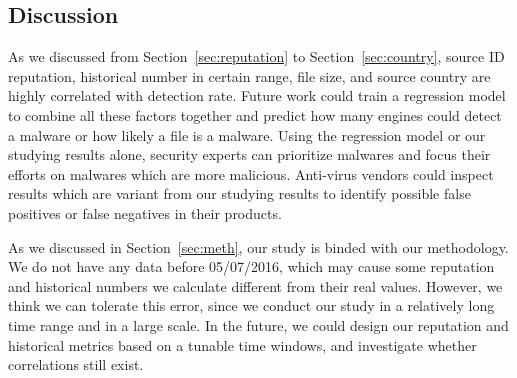 \subsection{Discussion}

As we discussed from Section~\ref{sec:reputation} to Section~\ref{sec:country}, 
source ID reputation, historical number in certain range, file size, 
and source country are highly correlated with detection rate. 
Future work could train a regression model to combine all these factors together and 
predict how many engines could detect a malware or how likely a file is a malware. 
Using the regression model or our studying results alone, 
security experts can prioritize malwares and focus their efforts on malwares which are more malicious. 
Anti-virus vendors could inspect results which are variant from our studying results 
to identify possible false positives or false negatives in their products. 

As we discussed in Section~\ref{sec:meth}, our study is binded with our methodology.
We do not have any data before 05/07/2016, 
which may cause some reputation and historical numbers 
we calculate different from their real values. 
However, we think we can tolerate this error, 
since we conduct our study in a relatively long time range and in a large scale. 
In the future, we could design our reputation and historical metrics based on a tunable time windows, and investigate whether correlations still exist.   
